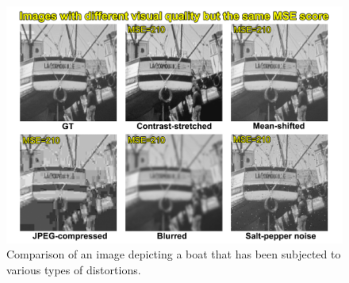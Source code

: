 \begin{figure}[ht]
    \centering
    \includegraphics[width=1.0\textwidth]{figures/psnr-critique.png}
    \caption{Comparison of an image depicting a boat that has been subjected to various types of distortions.}
    \label{fig:psnr-critique}
\end{figure}
